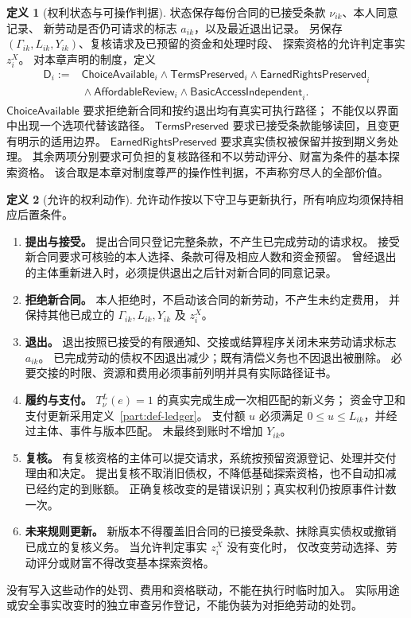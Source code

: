\documentclass[UTF8,12pt,a4paper,openany,fontset=none,zihao=false]{ctexrep}
\theoremstyle{definition}
\newtheorem{definition}{定义}[chapter]
\newcommand{\1}{\mathbf 1}
\begin{document}
\begin{definition}[权利状态与可操作判据]
\label{rights:state}
状态保存每份合同的已接受条款 \(\nu_{ik}\)、本人同意记录、
新劳动是否仍可请求的标志 \(a_{ik}\)，以及最近退出记录。
另保存 \((\Gamma_{ik},L_{ik},Y_{ik})\)、复核请求及已预留的资金和处理时段、
探索资格的允许判定事实 \(z_i^X\)。
对本章声明的制度，定义
\[
\begin{aligned}
\mathsf D_i:={}&
\mathsf{ChoiceAvailable}_i
\land\mathsf{TermsPreserved}_i
\land\mathsf{EarnedRightsPreserved}_i\\
&{}\land\mathsf{AffordableReview}_i
\land\mathsf{BasicAccessIndependent}_i .
\end{aligned}
\]
\(\mathsf{ChoiceAvailable}\) 要求拒绝新合同和按约退出均有真实可执行路径；
不能仅以界面中出现一个选项代替该路径。
\(\mathsf{TermsPreserved}\) 要求已接受条款能够读回，且变更有明示的适用边界。
\(\mathsf{EarnedRightsPreserved}\) 要求真实债权被保留并按到期义务处理。
其余两项分别要求可负担的复核路径和不以劳动评分、财富为条件的基本探索资格。
该合取是本章对制度尊严的操作性判据，不声称穷尽人的全部价值。
\end{definition}

\begin{definition}[允许的权利动作]
\label{rights:actions}
允许动作按以下守卫与更新执行，所有响应均须保持相应后置条件。
\begin{enumerate}
\item \textbf{提出与接受。}
提出合同只登记完整条款，不产生已完成劳动的请求权。
接受新合同要求可核验的本人选择、条款可得及相应人数和资金预留。
曾经退出的主体重新进入时，必须提供退出之后针对新合同的同意记录。
\item \textbf{拒绝新合同。}
本人拒绝时，不启动该合同的新劳动，不产生未约定费用，
并保持其他已成立的 \(\Gamma_{ik},L_{ik},Y_{ik}\) 及 \(z_i^X\)。
\item \textbf{退出。}
退出按照已接受的有限通知、交接或结算程序关闭未来劳动请求标志 \(a_{ik}\)。
已完成劳动的债权不因退出减少；既有清偿义务也不因退出被删除。
必要交接的时限、资源和费用必须事前列明并具有实际路径证书。
\item \textbf{履约与支付。}
\(T^L_\nu(e)=1\) 的真实完成生成一次相匹配的新义务；
资金守卫和支付更新采用定义~\ref{part:def-ledger}。
支付额 \(u\) 必须满足 \(0\le u\le L_{ik}\)，并经过主体、事件与版本匹配。
未最终到账时不增加 \(Y_{ik}\)。
\item \textbf{复核。}
有复核资格的主体可以提交请求，系统按预留资源登记、处理并交付理由和决定。
提出复核不取消旧债权，不降低基础探索资格，也不自动扣减已经约定的到账额。
正确复核改变的是错误识别；真实权利仍按原事件计数一次。
\item \textbf{未来规则更新。}
新版本不得覆盖旧合同的已接受条款、抹除真实债权或撤销已成立的复核义务。
当允许判定事实 \(z_i^X\) 没有变化时，
仅改变劳动选择、劳动评分或财富不得改变基本探索资格。
\end{enumerate}
没有写入这些动作的处罚、费用和资格联动，不能在执行时临时加入。
实际用途或安全事实改变时的独立审查另作登记，不能伪装为对拒绝劳动的处罚。
\end{definition}
\end{document}
